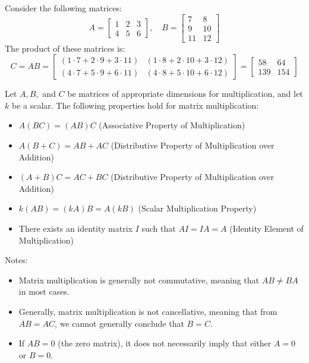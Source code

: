 \begin{eg}
    Consider the following matrices:
    \[
        A = 
        \begin{bmatrix}
            1 & 2 & 3 \\
            4 & 5 & 6
        \end{bmatrix}
        , \quad
        B = 
        \begin{bmatrix}
            7 & 8 \\
            9 & 10 \\
            11 & 12
        \end{bmatrix}
    \]
    The product of these matrices is:
    \[
        C = AB = 
        \begin{bmatrix}
            (1 \cdot 7 + 2 \cdot 9 + 3 \cdot 11) & (1 \cdot 8 + 2 \cdot 10 + 3 \cdot 12) \\
            (4 \cdot 7 + 5 \cdot 9 + 6 \cdot 11) & (4 \cdot 8 + 5 \cdot 10 + 6 \cdot 12)
        \end{bmatrix}
        =
        \begin{bmatrix}
            58 & 64 \\
            139 & 154
        \end{bmatrix}
    \]
\end{eg}
\begin{theorem}
    Let \( A, B, \) and \( C \) be matrices of appropriate dimensions for multiplication, and let \( k \) be a scalar. The following properties hold for matrix multiplication:
    \begin{itemize}[itemsep=1pt,label=$\circ$]
        \item \( A(BC) = (AB)C \) (Associative Property of Multiplication)
        \item \( A(B + C) = AB + AC \) (Distributive Property of Multiplication over Addition)
        \item \( (A + B)C = AC + BC \) (Distributive Property of Multiplication over Addition)
        \item \( k(AB) = (kA)B = A(kB) \) (Scalar Multiplication Property)
        \item There exists an identity matrix \( I \) such that \( AI = IA = A \) (Identity Element of Multiplication)
    \end{itemize}
\end{theorem}
Notes:
\begin{itemize}[itemsep=1pt,label=$\circ$]
    \item Matrix multiplication is generally not commutative, meaning that \( AB \neq BA \) in most cases.
    \item Generally, matrix multiplication is not cancellative, meaning that from \( AB = AC \), we cannot generally conclude that \( B = C \).
    \item If \( AB = 0 \) (the zero matrix), it does not necessarily imply that either \( A = 0 \) or \( B = 0 \).
\end{itemize}
